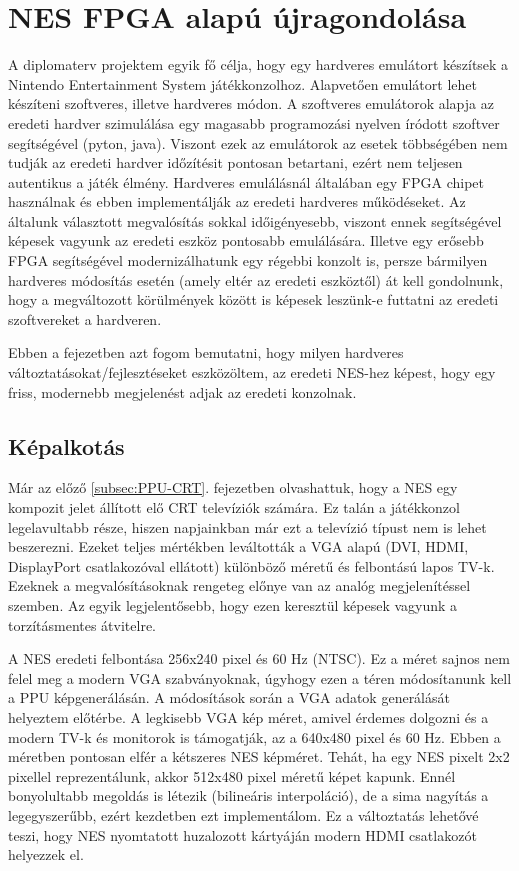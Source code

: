 \chapter{NES FPGA alapú újragondolása}

A diplomaterv projektem egyik fő célja, hogy egy hardveres emulátort készítsek a Nintendo Entertainment System játékkonzolhoz. Alapvetően emulátort lehet készíteni szoftveres, illetve hardveres módon. A szoftveres emulátorok alapja az eredeti hardver szimulálása egy magasabb programozási nyelven íródott szoftver segítségével (pyton, java). Viszont ezek az emulátorok az esetek többségében nem tudják az eredeti hardver időzítésit pontosan betartani, ezért nem teljesen autentikus a játék élmény. Hardveres emulálásnál általában egy FPGA chipet használnak és ebben implementálják az eredeti hardveres működéseket. Az általunk választott megvalósítás sokkal időigényesebb, viszont ennek segítségével képesek vagyunk az eredeti eszköz pontosabb emulálására. Illetve egy erősebb FPGA segítségével modernizálhatunk egy régebbi konzolt is, persze bármilyen hardveres módosítás esetén (amely eltér az eredeti eszköztől) át kell gondolnunk, hogy a megváltozott körülmények között is képesek leszünk-e futtatni az eredeti szoftvereket a hardveren. 

Ebben a fejezetben azt fogom bemutatni, hogy milyen hardveres változtatásokat/fejlesztéseket eszközöltem, az eredeti NES-hez képest, hogy egy friss, modernebb megjelenést adjak az eredeti konzolnak.

\section{Képalkotás}
\label{sec:picture-creation-ideas}

Már az előző \ref{subsec:PPU-CRT}. fejezetben olvashattuk, hogy a NES egy kompozit jelet állított elő CRT televíziók számára. Ez talán a játékkonzol legelavultabb része, hiszen napjainkban már ezt a televízió típust nem is lehet beszerezni. Ezeket teljes mértékben leváltották a VGA alapú (DVI, HDMI, DisplayPort csatlakozóval ellátott) különböző méretű és felbontású lapos TV-k. Ezeknek a megvalósításoknak rengeteg előnye van az analóg megjelenítéssel szemben. Az egyik legjelentősebb, hogy ezen keresztül képesek vagyunk a torzításmentes átvitelre.

A NES eredeti felbontása 256x240 pixel és 60 Hz (NTSC). Ez a  méret sajnos nem felel meg a modern VGA szabványoknak, úgyhogy ezen a téren módosítanunk kell a PPU képgenerálásán. A módosítások során a VGA adatok generálását helyeztem előtérbe. A legkisebb VGA kép méret, amivel érdemes dolgozni és a modern TV-k és monitorok is támogatják, az a 640x480 pixel és 60 Hz. Ebben a méretben pontosan elfér a kétszeres NES képméret. Tehát, ha egy NES pixelt 2x2 pixellel reprezentálunk, akkor 512x480 pixel méretű képet kapunk. Ennél bonyolultabb megoldás is létezik (bilineáris interpoláció), de a sima nagyítás a legegyszerűbb, ezért kezdetben ezt implementálom. Ez a változtatás lehetővé teszi, hogy NES nyomtatott huzalozott kártyáján modern HDMI csatlakozót helyezzek el. 

